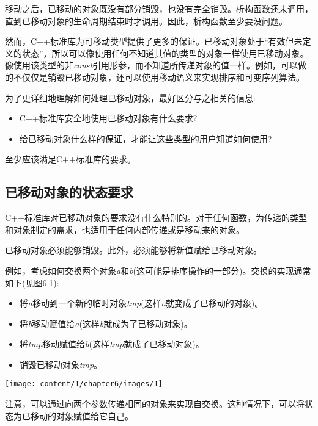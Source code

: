 移动之后，已移动的对象既没有部分销毁，也没有完全销毁。析构函数还未调用，直到已移动对象的生命周期结束时才调用。因此，析构函数至少要没问题。

然而，C++标准库为可移动类型提供了更多的保证。已移动对象处于“有效但未定义的状态”，所以可以像使用任何不知道其值的类型的对象一样使用已移动对象。像使用该类型的非\textit{const}引用形参，而不知道所传递对象的值一样。例如，可以做的不仅仅是销毁已移动对象，还可以使用移动语义来实现排序和可变序列算法。

为了更详细地理解如何处理已移动对象，最好区分与之相关的信息:

\begin{itemize}
	\item C++标准库安全地使用已移动对象有什么要求?
	\item 给已移动对象什么样的保证，才能让这些类型的用户知道如何使用?
\end{itemize}

至少应该满足C++标准库的要求。

\subsection{已移动对象的状态要求}

C++标准库对已移动对象的要求没有什么特别的。对于任何函数，为传递的类型和对象制定的需求，也适用于任何内部传递或是移动来的对象。

已移动对象必须能够销毁。此外，必须能够将新值赋给已移动对象。

例如，考虑如何交换两个对象\textit{a}和\textit{b}(这可能是排序操作的一部分)。交换的实现通常如下(见图6.1):

\begin{itemize}
	\item 将\textit{a}移动到一个新的临时对象\textit{tmp}(这样\textit{a}就变成了已移动的对象)。
	\item 将\textit{b}移动赋值给\textit{a}(这样\textit{b}就成为了已移动对象)。
	\item 将\textit{tmp}移动赋值给\textit{b}(这样\textit{tmp}就成了已移动对象)。
	\item 销毁已移动对象\textit{tmp}。
\end{itemize}

\begin{center}
	\texttt{[image: content/1/chapter6/images/1]}
\end{center}

注意，可以通过向两个参数传递相同的对象来实现自交换。这种情况下，可以将状态为已移动的对象赋值给它自己。

